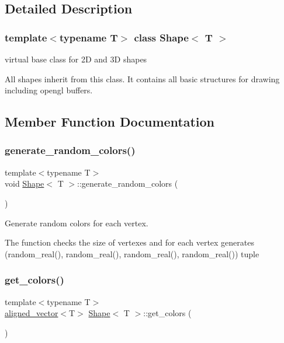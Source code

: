 \subsection{Detailed Description}
\subsubsection*{template$<$typename T$>$\newline
class Shape$<$ T $>$}

virtual base class for 2D and 3D shapes 

All shapes inherit from this class. It contains all basic structures for drawing including opengl buffers. 

\subsection{Member Function Documentation}
\mbox{\label{classShape_aabeb601fe95b412987d5b5c276bf8a7a}} 
\subsubsection{\texorpdfstring{generate\+\_\+random\+\_\+colors()}{generate\_random\_colors()}}
{\footnotesize\ttfamily template$<$typename T$>$ \\
void \mbox{\hyperlink{classShape}{Shape}}$<$ T $>$\+::generate\+\_\+random\+\_\+colors (\begin{DoxyParamCaption}{ }\end{DoxyParamCaption})\hspace{0.3cm}{\ttfamily [inline]}}



Generate random colors for each vertex. 

The function checks the size of vertexes and for each vertex generates (random\+\_\+real(), random\+\_\+real(), random\+\_\+real(), random\+\_\+real()) tuple \mbox{\label{classShape_aabe9bd208b0ece9824cb45deccc11ba7}} 
\subsubsection{\texorpdfstring{get\+\_\+colors()}{get\_colors()}}
{\footnotesize\ttfamily template$<$typename T$>$ \\
\mbox{\hyperlink{type__definitions_8hpp_a087efd587d66b881646ef378f1919c90}{aligned\+\_\+vector}}$<$T$>$ \mbox{\hyperlink{classShape}{Shape}}$<$ T $>$\+::get\+\_\+colors (\begin{DoxyParamCaption}{ }\end{DoxyParamCaption})\hspace{0.3cm}{\ttfamily [inline]}}

